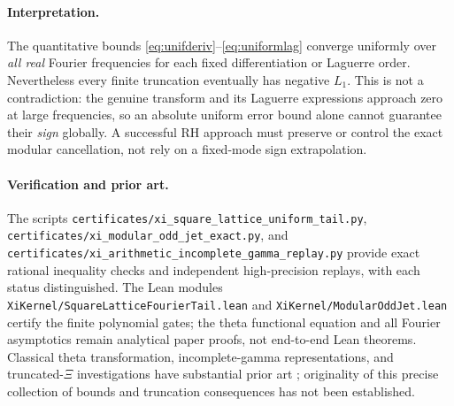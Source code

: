 \paragraph{Interpretation.}
The quantitative bounds
\eqref{eq:unifderiv}--\eqref{eq:uniformlag}
converge uniformly over \emph{all real}
Fourier frequencies for each fixed
differentiation or Laguerre order.
Nevertheless every finite truncation
eventually has negative $L_1$.
This is not a contradiction: the
genuine transform and its Laguerre
expressions approach zero at large
frequencies, so an absolute uniform
error bound alone cannot guarantee
their \emph{sign} globally.
A successful RH approach must preserve
or control the exact modular cancellation,
not rely on a fixed-mode sign extrapolation.

\paragraph{Verification and prior art.}
The scripts
\texttt{certificates/xi\_square\_lattice\_uniform\_tail.py},
\texttt{certificates/xi\_modular\_odd\_jet\_exact.py},
and
\texttt{certificates/xi\_arithmetic\_incomplete\_gamma\_replay.py}
provide exact rational inequality checks
and independent high-precision
replays, with each status distinguished.
The Lean modules
\texttt{XiKernel/SquareLatticeFourierTail.lean}
and \texttt{XiKernel/ModularOddJet.lean}
certify the finite polynomial gates;
the theta functional equation and all
Fourier asymptotics remain analytical
paper proofs, not end-to-end Lean theorems.
Classical theta transformation,
incomplete-gamma representations,
and truncated-\(\Xi\) investigations
have substantial prior art
\cite{DF,Haglund,Polson};
originality of this precise collection
of bounds and truncation consequences
has not been established.
